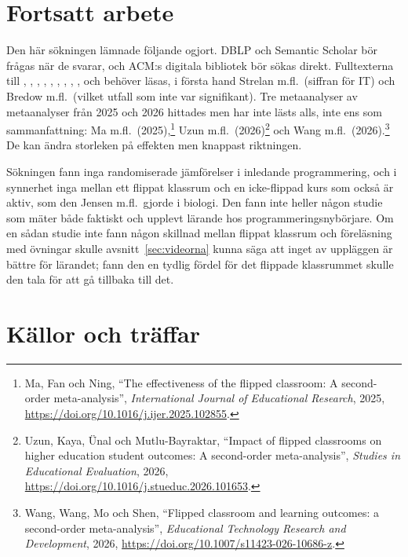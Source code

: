 \section{Fortsatt arbete}

Den här sökningen lämnade följande ogjort. DBLP och Semantic Scholar bör
frågas när de svarar, och ACM:s digitala bibliotek bör sökas direkt.
Fulltexterna till \textcite{Strelan2020}, \textcite{Bredow2021},
\textcite{Cheng2019}, \textcite{Hew2021methodology}, \textcite{Liu2026},
\textcite{Giannakos2014}, \textcite{Gillette2018}, \textcite{Tyler2018},
\textcite{Jones2026}, \textcite{Elliott2014} och \textcite{SoosaiRaj2018}
behöver läsas, i första hand Strelan m.fl.\ (siffran för IT) och Bredow
m.fl.\ (vilket utfall som inte var signifikant). Tre metaanalyser av
metaanalyser från 2025 och 2026 hittades men har inte lästs alls, inte
ens som sammanfattning: Ma m.fl.\ (2025),\footnote{Ma, Fan och Ning,
\enquote{The effectiveness of the flipped classroom: A second-order
meta-analysis}, \emph{International Journal of Educational Research},
2025, \url{https://doi.org/10.1016/j.ijer.2025.102855}.} Uzun m.fl.\
(2026)\footnote{Uzun, Kaya, Ünal och Mutlu-Bayraktar, \enquote{Impact of
flipped classrooms on higher education student outcomes: A second-order
meta-analysis}, \emph{Studies in Educational Evaluation}, 2026,
\url{https://doi.org/10.1016/j.stueduc.2026.101653}.} och Wang m.fl.\
(2026).\footnote{Wang, Wang, Mo och Shen, \enquote{Flipped classroom and
learning outcomes: a second-order meta-analysis}, \emph{Educational
Technology Research and Development}, 2026,
\url{https://doi.org/10.1007/s11423-026-10686-z}.} De kan ändra
storleken på effekten men knappast riktningen.

Sökningen fann inga randomiserade jämförelser i inledande programmering,
och i synnerhet inga mellan ett flippat klassrum och en icke-flippad kurs
som också är aktiv, som den Jensen m.fl.\ gjorde i biologi. Den fann
inte heller någon studie som mäter både faktiskt och upplevt lärande hos
programmeringsnybörjare. Om en
sådan studie inte fann någon skillnad mellan flippat klassrum och
föreläsning med övningar skulle avsnitt~\ref{sec:videorna} kunna säga att
inget av uppläggen är bättre för lärandet; fann den en tydlig fördel för
det flippade klassrummet skulle den tala för att gå tillbaka till det.

\section{Källor och träffar}

